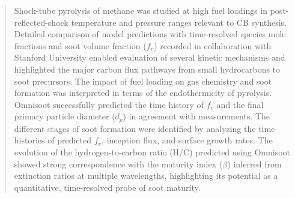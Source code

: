 \begin{abstract}
Shock-tube pyrolysis of methane was studied at high fuel loadings in post-reflected-shock temperature and pressure ranges relevant to CB synthesis. Detailed comparison of model predictions with time-resolved species mole fractions and soot volume fraction ($f_v$) recorded in collaboration with Stanford University enabled evaluation of several kinetic mechanisms and highlighted the major carbon flux pathways from small hydrocarbons to soot precursors. The impact of fuel loading on gas chemistry and soot formation was interpreted in terms of the endothermicity of pyrolysis. Omnisoot successfully predicted the time history of $f_v$ and the final primary particle diameter ($d_p$) in agreement with measurements. The different stages of soot formation were identified by analyzing the time histories of predicted $f_v$, inception flux, and surface growth rates. The evolution of the hydrogen-to-carbon ratio (H/C) predicted using Omnisoot showed strong correspondence with the maturity index ($\beta$) inferred from extinction ratios at multiple wavelengths, highlighting its potential as a quantitative, time-resolved probe of soot maturity.
 
\end{abstract}

